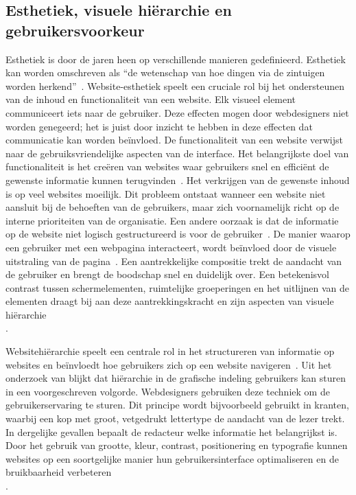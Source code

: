 \subsection [Esthetiek, hiërarchie en voorkeur]{Esthetiek, visuele hiërarchie en\\gebruikersvoorkeur}
Esthetiek is door de jaren heen op verschillende manieren gedefinieerd. Esthetiek kan worden omschreven als “de wetenschap van hoe dingen via de zintuigen worden herkend”~\autocite[p.~12]{Noponen2017}. Website-esthetiek speelt een cruciale rol bij het ondersteunen van de inhoud en functionaliteit van een website. Elk visueel element communiceert iets naar de gebruiker. Deze effecten mogen door webdesigners niet worden genegeerd; het is juist door inzicht te hebben in deze effecten dat communicatie kan worden beïnvloed. 
De functionaliteit van een website verwijst naar de gebruiksvriendelijke aspecten van de interface. Het belangrijkste doel van functionaliteit is het creëren van websites waar gebruikers snel en efficiënt de gewenste informatie kunnen terugvinden~\autocite{Thorlacius2007}. Het verkrijgen van de gewenste inhoud is op veel websites moeilijk. Dit probleem ontstaat wanneer een website niet aansluit bij de behoeften van de gebruikers, maar zich voornamelijk richt op de interne prioriteiten van de organisatie. Een andere oorzaak is dat de informatie op de website niet logisch gestructureerd is voor de gebruiker~\autocite{Bevan1997}.
De manier waarop een gebruiker met een webpagina interacteert, wordt beïnvloed door de visuele uitstraling van de pagina~\autocite{Michailidou2008}. Een aantrekkelijke compositie trekt de aandacht van de gebruiker en brengt de boodschap snel en duidelijk over. Een betekenisvol contrast tussen schermelementen, ruimtelijke groeperingen en het uitlijnen van de elementen draagt bij aan deze aantrekkingskracht en zijn aspecten van visuele hiërarchie\\ \autocite{Bhaskar2011}. 

Websitehiërarchie speelt een centrale rol in het structureren van informatie op websites en beïnvloedt hoe gebruikers zich op een website navigeren~\autocite{Djonov2007}. Uit het onderzoek van \textcite{Urano2021} blijkt dat hiërarchie in de grafische indeling gebruikers kan sturen in een voorgeschreven volgorde. Webdesigners gebruiken deze techniek om de gebruikerservaring te sturen. Dit principe wordt bijvoorbeeld gebruikt in kranten, waarbij een kop met groot, vetgedrukt lettertype de aandacht van de lezer trekt. In dergelijke gevallen bepaalt de redacteur welke informatie het belangrijkst is. Door het gebruik van grootte, kleur, contrast, positionering en typografie kunnen websites op een soortgelijke manier hun gebruikersinterface optimaliseren en de bruikbaarheid verbeteren\\\autocite{Raghavendra2024}.

